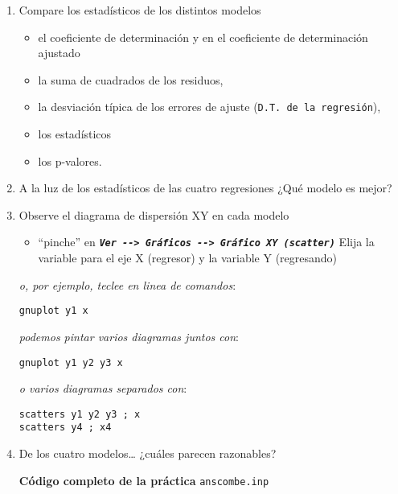\documentclass[11pt]{article}
\begin{document}
\begin{enumerate}
\item Compare los estadísticos de los distintos modelos
\label{sec:org55b87c1}
\begin{itemize}
\item el coeficiente de determinación y en el coeficiente de determinación ajustado
\item la suma de cuadrados de los residuos,
\item la desviación típica de los errores de ajuste (\texttt{D.T. de la regresión}),
\item los estadísticos \testadistico
\item los p-valores.
\end{itemize}

\item A la luz de los estadísticos de las cuatro regresiones ¿Qué modelo es mejor?
\label{sec:org62f084b}

\item Observe el diagrama de dispersión XY en cada modelo
\label{sec:org86a7b08}

\begin{itemize}
\item ``pinche'' en \textbf{\emph{\texttt{Ver -{}-> Gráficos -{}-> Gráfico XY (scatter)}}}
Elija la variable para el eje X (regresor) y la variable Y
(regresando)
\end{itemize}

{\vspace{3pt} \color{gray!70!black}
\emph{o, por ejemplo, teclee en linea de comandos}:
\begin{verbatim}
gnuplot y1 x
\end{verbatim}
\emph{podemos pintar varios diagramas juntos con}:
\begin{verbatim}
gnuplot y1 y2 y3 x
\end{verbatim}
\emph{o varios diagramas separados con}:
\begin{verbatim}
scatters y1 y2 y3 ; x
scatters y4 ; x4
\end{verbatim}
}

\vspace{-10pt}

\item De los cuatro modelos\dots{} ¿cuáles parecen razonables?
\label{sec:orgabdf6e1}


\vspace{16pt}
\noindent
\textbf{Código completo de la práctica} \texttt{anscombe.inp}
\vspace{10pt}

\clearpage
\end{enumerate}
\end{document}
